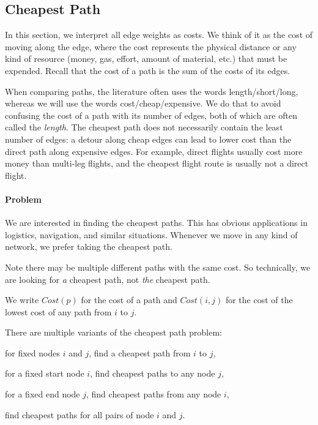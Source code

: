 \subsection{Cheapest Path}\label{sec:ad:shortestpath}

In this section, we interpret all edge weights as costs.
We think of it as the cost of moving along the edge, where the cost represents the physical distance or any kind of resource (money, gas, effort, amount of material, etc.) that must be expended.
Recall that the cost of a path is the sum of the costs of its edges.

When comparing paths, the literature often uses the words length/short/long, whereas we will use the words cost/cheap/expensive.
We do that to avoid confusing the cost of a path with its number of edges, both of which are often called the \emph{length}.
The cheapest path does not necessarily contain the least number of edges: a detour along cheap edges can lead to lower cost than the direct path along expensive edges.
For example, direct flights usually cost more money than multi-leg flights, and the cheapest flight route is usually not a direct flight.

\paragraph{Problem}
We are interested in finding the cheapest paths.
This has obvious applications in logistics, navigation, and similar situations.
Whenever we move in any kind of network, we prefer taking the cheapest path.

Note there may be multiple different paths with the same cost. So technically, we are looking for \emph{a} cheapest path, not \emph{the} cheapest path.

We write $Cost(p)$ for the cost of a path and $Cost(i,j)$ for the cost of the lowest cost of any path from $i$ to $j$.

There are multiple variants of the cheapest path problem:
\begin{compactitem}
 \item for fixed nodes $i$ and $j$, find a cheapest path from $i$ to $j$,
 \item for a fixed start node $i$, find cheapest paths to any node $j$,
 \item for a fixed end node $j$, find cheapest paths from any node $i$,
 \item find cheapest paths for all pairs of node $i$ and $j$.
\end{compactitem}

